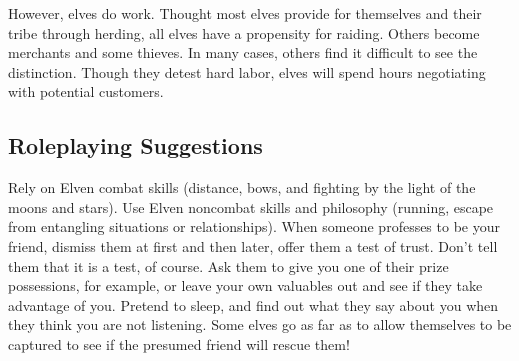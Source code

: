 However, elves do work. Thought most elves provide for themselves and their tribe through herding, all elves have a propensity for raiding. Others become merchants and some thieves. In many cases, others find it difficult to see the distinction. Though they detest hard labor, elves will spend hours negotiating with potential customers.

\subsection{Roleplaying Suggestions}
Rely on Elven combat skills (distance, bows, and fighting by the light of the moons and stars). Use Elven noncombat skills and philosophy (running, escape from entangling situations or relationships). When someone professes to be your friend, dismiss them at first and then later, offer them a test of trust. Don't tell them that it is a test, of course. Ask them to give you one of their prize possessions, for example, or leave your own valuables out and see if they take advantage of you. Pretend to sleep, and find out what they say about you when they think you are not listening. Some elves go as far as to allow themselves to be captured to see if the presumed friend will rescue them!

